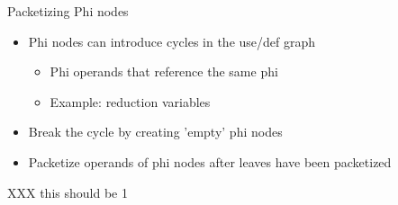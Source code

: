 \begin{frame}[fragile]{Packetizing Phi nodes}

\begin{itemize}
    \item Phi nodes can introduce cycles in the use/def graph
    \begin{itemize}
        \item Phi operands that reference the same phi
        \item Example: reduction variables
    \end{itemize}
    \item Break the cycle by creating 'empty' phi nodes
    \item Packetize operands of phi nodes after leaves have been packetized
\end{itemize}

XXX this should be 1


\end{frame}

